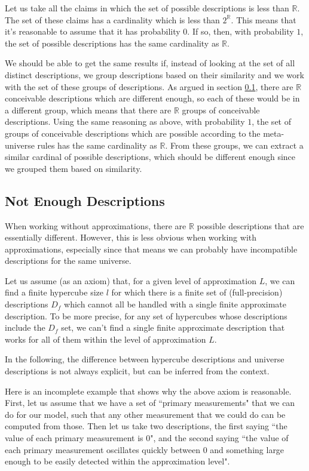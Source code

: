 \documentclass[a4paper
,draft
]{article}
\def\reale{\mathbb{R}}
\newcommand{\ghilimele}[1]{``#1"}
\begin{document}
Let us take all the claims in which the set of possible descriptions
is less than $\reale$.
The set of these claims has a cardinality which is less than $2^\reale$.
This means that it's reasonable to assume that it has probability $0$.
If so, then, with probability $1$, the set of possible descriptions has the same
cardinality as $\reale$.

We should be able to get the same results if, instead of looking at the set
of all distinct descriptions, we group descriptions based on their similarity
and we work with the set of these groups of descriptions.
As argued in section \ref{sec:not-enough-descriptions},
there are $\reale$ conceivable descriptions which are different
enough, so each of these would be in a different group, which means that
there are $\reale$ groups of conceivable descriptions.
Using the same reasoning as above, with probability $1$, the set of groups of
conceivable descriptions which are possible according to the meta-universe
rules has the same cardinality as $\reale$.
From these groups, we can extract a similar cardinal of
possible descriptions, which should be different enough since we grouped them
based on similarity.

\subsection{Not Enough Descriptions}
\label{sec:not-enough-descriptions}

When working without approximations, there are $\reale$ possible descriptions
that are essentially different. However, this is less obvious when working with
approximations, especially since that means we can probably have incompatible
descriptions for the same universe.

Let us assume (as an axiom) that, for a given level of approximation $L$, we can
find a finite hypercube size $l$ for which there is a finite set of
(full-precision)
descriptions $D_f$ which cannot all be handled with a single finite approximate
description. To be more precise,
for any set of hypercubes whose descriptions include the $D_f$ set, we can't
find a single finite approximate description that works for all of them
within the level of approximation $L$.

In the following, the difference between
hypercube descriptions and universe descriptions is not always explicit,
but can be inferred from the context.

Here is an incomplete example that shows why the above axiom is reasonable.
First, let us assume that we have a set of
\ghilimele{primary measurements} that we
can do for our model, such that any other measurement that we could do can be
computed from those.
Then let us take two descriptions, the first saying
\ghilimele{the value of each primary measurement is $0$},
and the second saying
\ghilimele{the value of each primary measurement oscillates quickly
  between $0$ and something large enough to be easily detected within
  the approximation level}.
\end{document}
